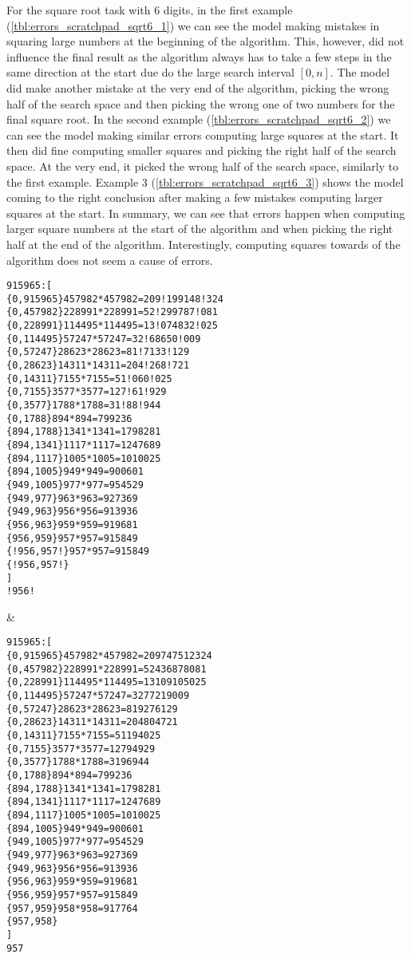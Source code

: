 For the square root task with 6 digits, in the first example (\cref{tbl:errors_scratchpad_sqrt6_1}) we can see the model making mistakes in squaring large numbers at the beginning of the algorithm. This, however, did not influence the final result as the algorithm always has to take a few steps in the same direction at the start due do the large search interval $[0, n]$.
The model did make another mistake at the very end of the algorithm, picking the wrong half of the search space and then picking the wrong one of two numbers for the final square root.
In the second example (\cref{tbl:errors_scratchpad_sqrt6_2}) we can see the model making similar errors computing large squares at the start. It then did fine computing smaller squares and picking the right half of the search space. At the very end, it picked the wrong half of the search space, similarly to the first example.
Example 3 (\cref{tbl:errors_scratchpad_sqrt6_3}) shows the model coming to the right conclusion after making a few mistakes computing larger squares at the start.
In summary, we can see that errors happen when computing larger square numbers at the start of the algorithm and when picking the right half at the end of the algorithm. Interestingly, computing squares towards of the algorithm does not seem a cause of errors.

\ErrorAnalysisTableBegin
\begin{lstlisting}
915965:[
{0,915965}457982*457982=209!199148!324
{0,457982}228991*228991=52!299787!081
{0,228991}114495*114495=13!074832!025
{0,114495}57247*57247=32!68650!009
{0,57247}28623*28623=81!7133!129
{0,28623}14311*14311=204!268!721
{0,14311}7155*7155=51!060!025
{0,7155}3577*3577=127!61!929
{0,3577}1788*1788=31!88!944
{0,1788}894*894=799236
{894,1788}1341*1341=1798281
{894,1341}1117*1117=1247689
{894,1117}1005*1005=1010025
{894,1005}949*949=900601
{949,1005}977*977=954529
{949,977}963*963=927369
{949,963}956*956=913936
{956,963}959*959=919681
{956,959}957*957=915849
{!956,957!}957*957=915849
{!956,957!}
]
!956!
\end{lstlisting} &
\begin{lstlisting}
915965:[
{0,915965}457982*457982=209747512324
{0,457982}228991*228991=52436878081
{0,228991}114495*114495=13109105025
{0,114495}57247*57247=3277219009
{0,57247}28623*28623=819276129
{0,28623}14311*14311=204804721
{0,14311}7155*7155=51194025
{0,7155}3577*3577=12794929
{0,3577}1788*1788=3196944
{0,1788}894*894=799236
{894,1788}1341*1341=1798281
{894,1341}1117*1117=1247689
{894,1117}1005*1005=1010025
{894,1005}949*949=900601
{949,1005}977*977=954529
{949,977}963*963=927369
{949,963}956*956=913936
{956,963}959*959=919681
{956,959}957*957=915849
{957,959}958*958=917764
{957,958}
]
957
\end{lstlisting} \\


